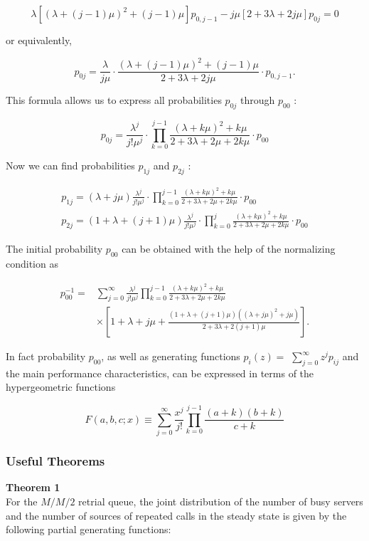 \documentclass[10pt]{article}
\begin{document}
$$
\lambda\left[(\lambda+(j-1) \mu)^{2}+(j-1) \mu\right] p_{0, j-1}-j \mu[2+3 \lambda+2 j \mu] p_{0 j}=0
$$

or equivalently,

$$
p_{0 j}=\frac{\lambda}{j \mu} \cdot \frac{(\lambda+(j-1) \mu)^{2}+(j-1) \mu}{2+3 \lambda+2 j \mu} \cdot p_{0, j-1} .
$$

This formula allows us to express all probabilities $p_{0 j}$ through $p_{00}$ :


\begin{equation*}
p_{0 j}=\frac{\lambda^{j}}{j ! \mu^{j}} \cdot \prod_{k=0}^{j-1} \frac{(\lambda+k \mu)^{2}+k \mu}{2+3 \lambda+2 \mu+2 k \mu} \cdot p_{00} 
\end{equation*}


Now we can find probabilities $p_{1 j}$ and $p_{2 j}$ :

$$
\begin{gathered}
p_{1 j}=(\lambda+j \mu) \frac{\lambda^{j}}{j ! \mu^{j}} \cdot \prod_{k=0}^{j-1} \frac{(\lambda+k \mu)^{2}+k \mu}{2+3 \lambda+2 \mu+2 k \mu} \cdot p_{00} \\
p_{2 j}=(1+\lambda+(j+1) \mu) \frac{\lambda^{j}}{j ! \mu^{j}} \cdot \prod_{k=0}^{j} \frac{(\lambda+k \mu)^{2}+k \mu}{2+3 \lambda+2 \mu+2 k \mu} \cdot p_{00}
\end{gathered}
$$

The initial probability $p_{00}$ can be obtained with the help of the normalizing condition as

$$
\begin{aligned}
p_{00}^{-1}= & \sum_{j=0}^{\infty} \frac{\lambda^{j}}{j ! \mu^{j}} \prod_{k=0}^{j-1} \frac{(\lambda+k \mu)^{2}+k \mu}{2+3 \lambda+2 \mu+2 k \mu} \\
& \times\left[1+\lambda+j \mu+\frac{(1+\lambda+(j+1) \mu)\left((\lambda+j \mu)^{2}+j \mu\right)}{2+3 \lambda+2(j+1) \mu}\right] .
\end{aligned}
$$

In fact probability $p_{00}$, as well as generating functions $p_{i}(z)=$ $\sum_{j=0}^{\infty} z^{j} p_{i j}$ and the main performance characteristics, can be expressed in terms of the hypergeometric functions


\begin{equation*}
F(a, b, c ; x) \equiv \sum_{j=0}^{\infty} \frac{x^{j}}{j !} \prod_{k=0}^{j-1} \frac{(a+k)(b+k)}{c+k} 
\end{equation*}

\subsubsection{Useful Theorems}
\textbf{Theorem 1} \\ 
 For the $M / M / 2$ retrial queue, the joint distribution of the number of busy servers and the number of sources of repeated calls in the steady state is given by the following partial generating functions:
\end{document}
